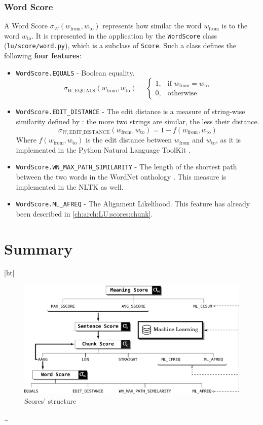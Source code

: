 \subsubsection{Word Score} \label{ch:arch:LU:scores:word}
A Word Score $\sigma_W(w_\text{from},w_\text{to})$ represents how similar the word $w_\text{from}$ is to the word $w_\text{to}$. It is represented in the application by the \texttt{WordScore} class (\texttt{lu/score/word.py}), which is a subclass of \texttt{Score}. Such a class defines the following \textbf{four features}:
\begin{itemize}
	\item \texttt{WordScore.EQUALS} - Boolean equality.
	\begin{displaymath}
		\sigma_{W,\text{EQUALS}}(w_\text{from},w_\text{to}) = \begin{cases} 1, & \mbox{if } w_\text{from} = w_\text{to} \\
		                                                                    0, & \mbox{otherwise} \end{cases}
	\end{displaymath}
	
	\item \texttt{WordScore.EDIT\_DISTANCE} - The edit distance is a measure of string-wise similarity defined by \cite{levelshtein-66-binary}: the more two strings are similar, the less their distance.
	\begin{displaymath}
		\sigma_{W,\text{EDIT\_DISTANCE}}(w_\text{from},w_\text{to}) = 1-f(w_\text{from},w_\text{to})
	\end{displaymath}
	Where $f(w_\text{from},w_\text{to})$ is the edit distance between $w_\text{from}$ and $w_\text{to}$, as it is implemented in the Python Natural Language ToolKit \citep{Loper:2002:NNL:1118108.1118117}.
	
	\item \texttt{WordScore.WN\_MAX\_PATH\_SIMILARITY} - The length of the shortest path between the two words in the WordNet onthology \citep{Miller:1995:WLD:219717.219748}. This measure is implemented in the NLTK as well.
	
	\item \texttt{WordScore.ML\_AFREQ} - The Alignment Likelihood. This feature has already been described in \ref{ch:arch:LU:scores:chunk}.
\end{itemize}

\section{Summary}[ht]
\begin{figure}
\includegraphics[width=23cm]{Pictures/scores_diagram.pdf}
\caption{Scores' structure}
\end{figure}

\ldots